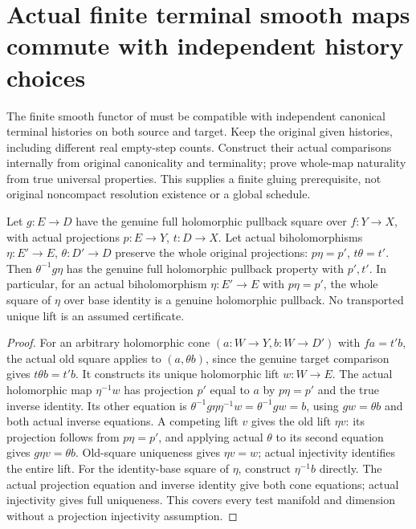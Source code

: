 \section{Actual finite terminal smooth maps commute with independent history choices}

The finite smooth functor of \cite{bierstone-milman08-functoriality} must be
compatible with independent canonical terminal histories on both source
and target. Keep the original given histories, including different real
empty-step counts. Construct their actual comparisons internally from
original canonicality and terminality; prove whole-map naturality from
true universal properties. This supplies a finite gluing prerequisite,
not original noncompact resolution existence or a global schedule.

\begin{lemma}
\label{hir:smooth-terminal-full-square-biholomorphic-transport}
\leanok
{}
Let $g:E\to D$ have the genuine full holomorphic pullback square over
$f:Y\to X$, with actual projections $p:E\to Y$, $t:D\to X$.
Let actual biholomorphisms $\eta:E'\to E$, $\theta:D'\to D$ preserve
the whole original projections: $p\eta=p'$, $t\theta=t'$.
Then $\theta^{-1}g\eta$ has the genuine full holomorphic pullback
property with $p',t'$. In particular, for an actual biholomorphism
$\eta:E'\to E$ with $p\eta=p'$, the whole square of $\eta$ over
base identity is a genuine holomorphic pullback. No transported unique
lift is an assumed certificate.
\end{lemma}
\begin{proof}
For an arbitrary holomorphic cone $(a:W\to Y,b:W\to D')$ with
$fa=t'b$, the actual old square applies to $(a,\theta b)$, since
the genuine target comparison gives $t\theta b=t'b$. It constructs
its unique holomorphic lift $w:W\to E$. The actual holomorphic map
$\eta^{-1}w$ has projection $p'$ equal to $a$ by
$p\eta=p'$ and the true inverse identity. Its other equation is
$\theta^{-1}g\eta\eta^{-1}w=\theta^{-1}gw=b$, using
$gw=\theta b$ and both actual inverse equations. A competing lift
$v$ gives the old lift $\eta v$: its projection follows from
$p\eta=p'$, and applying actual $\theta$ to its second equation
gives $g\eta v=\theta b$. Old-square uniqueness gives $\eta v=w$;
actual injectivity identifies the entire lift. For the identity-base
square of $\eta$, construct $\eta^{-1}b$ directly. The actual
projection equation and inverse identity give both cone equations;
actual injectivity gives full uniqueness. This covers every test
manifold and dimension without a projection injectivity assumption.
\end{proof}

